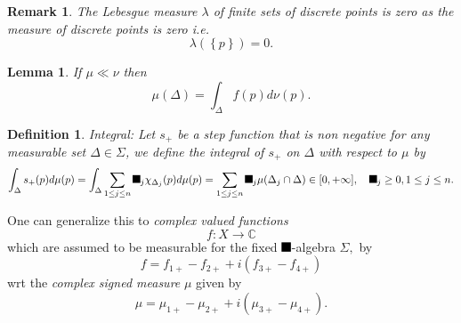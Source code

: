 \documentclass[aps,preprint]{revtex4}%
\providecommand{\U}[1]{\protect\rule{.1in}{.1in}}
\newtheorem{definition}[theorem]{Definition}
\newtheorem{lemma}[theorem]{Lemma}
\newtheorem{remark}[theorem]{Remark}
\begin{document}
\begin{remark}
The \emph{Lebesgue measure }$\lambda$ \emph{of }finite sets of discrete points
is zero as the measure of discrete points is zero i.e.
\begin{equation}
\lambda\left(  \left\{  p\right\}  \right)  =0.
\end{equation}

\end{remark}

\begin{lemma}
If $\mu\ll\nu$ then
\begin{equation}
\mu\left(  \Delta\right)  =\int_{\Delta}f\left(  p\right)  d\nu\left(
p\right)  .
\end{equation}

\end{lemma}

\begin{definition}
Integral: Let $s_{+}$ be a step function that is non negative for any
measurable set $\Delta\in\Sigma$, we define the \emph{integral} of $s_{+}$ on
$\Delta$ with respect to $%
\mu
$ by%
\begin{equation}
\int_{\Delta}s_{+}(p)d%
\mu
(p)=\int_{\Delta}\sum_{1\leq j\leq n}\U{3b1} _{j}\chi_{\Delta_{j}}(p)d%
\mu
(p)=\sum_{1\leq j\leq n}\U{3b1} _{j}%
\mu
(\Delta_{j}\cap\Delta)\in\lbrack0,+\infty],\quad\U{3b1} _{j}\geq0,1\leq j\leq
n.
\end{equation}

\end{definition}

One can generalize this to \emph{complex valued functions }%
\begin{equation}
f:X\rightarrow\mathbb{C}%
\end{equation}
which are assumed to be measurable for the fixed $\U{3c3} $-algebra $\Sigma,$
by
\begin{equation}
f=f_{1+}-f_{2+}+i\left(  f_{3+}-f_{4+}\right)
\end{equation}
wrt the \emph{complex signed measure }$%
\mu
$ given by \emph{ }
\begin{equation}%
\mu
=%
\mu
_{1+}-%
\mu
_{2+}+i\left(
\mu
_{3+}-%
\mu
_{4+}\right)  .
\end{equation}
\end{document}
